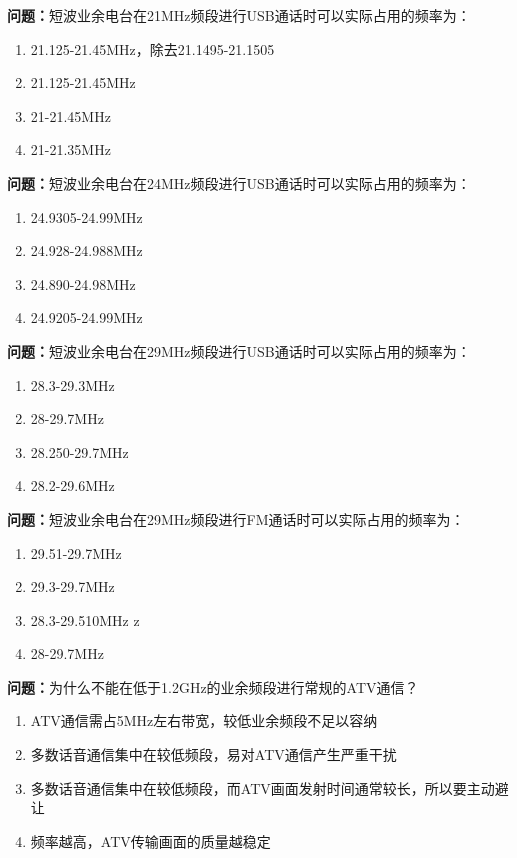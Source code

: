 \bigskip


\noindent\textbf{问题：}短波业余电台在21MHz频段进行USB通话时可以实际占用的频率为：
\begin{enumerate}[label=\Alph*), leftmargin=3em]
\item 21.125-21.45MHz，除去21.1495-21.1505
\item 21.125-21.45MHz
\item 21-21.45MHz
\item 21-21.35MHz
\end{enumerate}

\bigskip


\noindent\textbf{问题：}短波业余电台在24MHz频段进行USB通话时可以实际占用的频率为：
\begin{enumerate}[label=\Alph*), leftmargin=3em]
\item 24.9305-24.99MHz
\item 24.928-24.988MHz
\item 24.890-24.98MHz
\item 24.9205-24.99MHz
\end{enumerate}

\bigskip


\noindent\textbf{问题：}短波业余电台在29MHz频段进行USB通话时可以实际占用的频率为：
\begin{enumerate}[label=\Alph*), leftmargin=3em]
\item 28.3-29.3MHz
\item 28-29.7MHz
\item 28.250-29.7MHz
\item 28.2-29.6MHz
\end{enumerate}

\bigskip


\noindent\textbf{问题：}短波业余电台在29MHz频段进行FM通话时可以实际占用的频率为：
\begin{enumerate}[label=\Alph*), leftmargin=3em]
\item 29.51-29.7MHz
\item 29.3-29.7MHz
\item 28.3-29.510MHz z
\item 28-29.7MHz
\end{enumerate}

\bigskip


\noindent\textbf{问题：}为什么不能在低于1.2GHz的业余频段进行常规的ATV通信？
\begin{enumerate}[label=\Alph*), leftmargin=3em]
\item ATV通信需占5MHz左右带宽，较低业余频段不足以容纳
\item 多数话音通信集中在较低频段，易对ATV通信产生严重干扰
\item 多数话音通信集中在较低频段，而ATV画面发射时间通常较长，所以要主动避让
\item 频率越高，ATV传输画面的质量越稳定
\end{enumerate}

